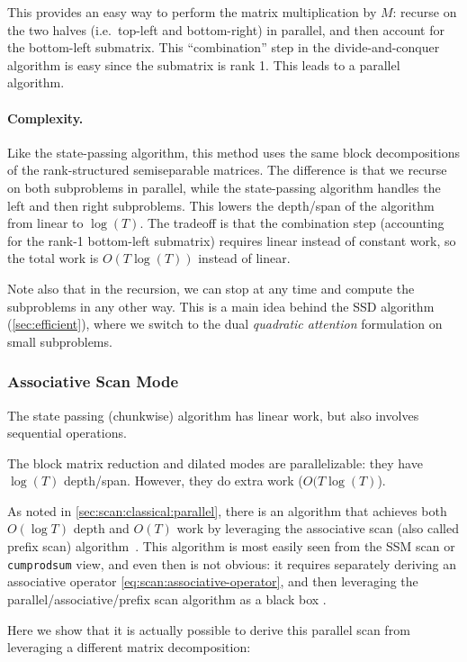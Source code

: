 \documentclass{article}
\newcommand{\citep}{\parencite}
\begin{document}
This provides an easy way to perform the matrix multiplication by $M$:
recurse on the two halves (i.e.\ top-left and bottom-right) in parallel,
and then account for the bottom-left submatrix.
This ``combination'' step in the divide-and-conquer algorithm is easy since the submatrix is rank 1.
This leads to a parallel algorithm.

\paragraph{Complexity.}
Like the state-passing algorithm,
this method uses the same block decompositions of the rank-structured semiseparable matrices.
The difference is that we recurse on both subproblems in parallel,
while the state-passing algorithm handles the left and then right subproblems.
This lowers the depth/span of the algorithm from linear to $\log(T)$.
The tradeoff is that the combination step (accounting for the rank-1 bottom-left submatrix) requires linear instead of constant work,
so the total work is $O(T\log(T))$ instead of linear.

Note also that in the recursion,
we can stop at any time and compute the subproblems in any other way.
This is a main idea behind the SSD algorithm (\cref{sec:efficient}),
where we switch to the dual \emph{quadratic attention} formulation on small subproblems.

\subsubsection{Associative Scan Mode}
\label{sec:scan:associative}

The state passing (chunkwise) algorithm has linear work, but also involves sequential operations.

The block matrix reduction and dilated modes are parallelizable: they have $\log(T)$ depth/span. However, they do extra work ($O(T \log(T)$).

As noted in \cref{sec:scan:classical:parallel}, there is an algorithm that achieves both $O(\log T)$ depth and $O(T)$ work by leveraging the associative scan (also called prefix scan) algorithm~\citep{baker1996pade}.
This algorithm is most easily seen from the SSM scan or \texttt{cumprodsum} view, and even then is not obvious: it requires separately deriving an associative operator \eqref{eq:scan:associative-operator},
and then leveraging the parallel/associative/prefix scan algorithm as a black box \citep{blelloch1990prefix}.

Here we show that it is actually possible to derive this parallel scan from leveraging a different matrix decomposition:
\end{document}
